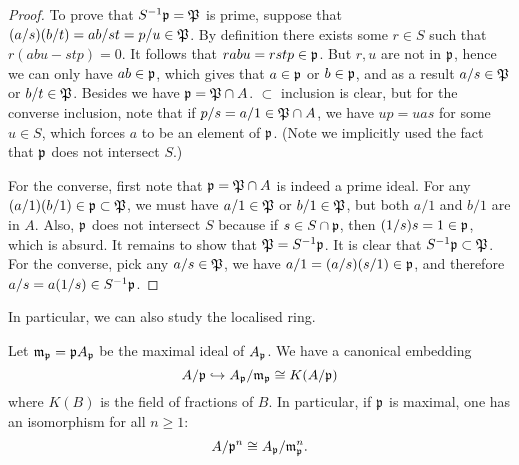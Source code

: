 			\begin{proof}
				To prove that $S^{-1}\mathfrak{p}=\mathfrak{P}$ is prime, suppose that $(a/s)(b/t)=ab/st = p/u \in \mathfrak{P}$. By definition there exists some $r \in S$ such that $r(abu-stp)=0$. It follows that $rabu=rstp \in \mathfrak{p}$. But $r,u$ are not in $\mathfrak{p}$, hence we can only have $ab \in \mathfrak{p}$, which gives that $a \in \mathfrak{p}$ or $b \in \mathfrak{p}$, and as a result $a/s \in \mathfrak{P}$ or $b/t \in \mathfrak{P}$. Besides we have $\mathfrak{p} = \mathfrak{P} \cap A$. $\subset$ inclusion is clear, but for the converse inclusion, note that if $p/s=a/1 \in \mathfrak{P} \cap A$, we have $up=uas$ for some $u \in S$, which forces $a$ to be an element of $\mathfrak{p}$. (Note we implicitly used the fact that $\mathfrak{p}$ does not intersect $S$.)
				
				For the converse, first note that $\mathfrak{p}=\mathfrak{P} \cap A$ is indeed a prime ideal. For any $(a/1)(b/1) \in \mathfrak{p} \subset \mathfrak{P}$, we must have $a/1 \in \mathfrak{P}$ or $b/1 \in \mathfrak{P}$, but both $a/1$ and $b/1$ are in $A$. Also, $\mathfrak{p}$ does not intersect $S$ because if $s \in S \cap \mathfrak{p}$, then $(1/s)s=1\in \mathfrak{p}$, which is absurd. It remains to show that $\mathfrak{P} = S^{-1}\mathfrak{p}$. It is clear that $S^{-1}\mathfrak{p} \subset \mathfrak{P}$. For the converse, pick any $a/s \in \mathfrak{P}$, we have $a/1=(a/s)(s/1) \in \mathfrak{p}$, and therefore $a/s=a(1/s) \in S^{-1}\mathfrak{p}$.
			\end{proof}
			In particular, we can also study the localised ring.
			\begin{corollary}
				Let $\mathfrak{m}_\mathfrak{p}=\mathfrak{p}A_\mathfrak{p}$ be the maximal ideal of $A_\mathfrak{p}$. We have a canonical embedding
				\[
					A/\mathfrak{p} \hookrightarrow A_\mathfrak{p}/\mathfrak{m}_\mathfrak{p} \cong K(A/\mathfrak{p})
				\]
				where $K(B)$ is the field of fractions of $B$. In particular, if $\mathfrak{p}$ is maximal, one has an isomorphism for all $n \ge 1$:
				\[
					A/\mathfrak{p}^n \cong A_\mathfrak{p}/\mathfrak{m}_\mathfrak{p}^n.
				\]
			\end{corollary}
